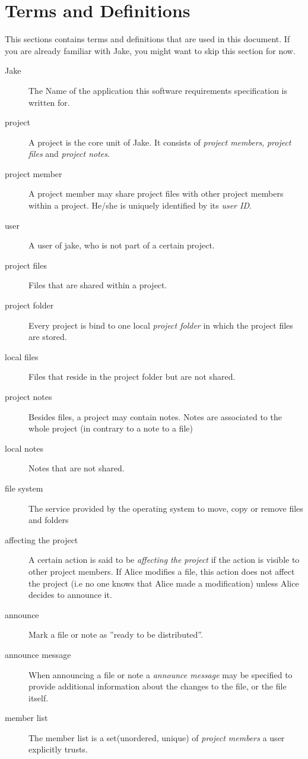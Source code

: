 \section{Terms and Definitions}
This sections contains terms and definitions that are used in this document. If you are already familiar with Jake, you might want to skip this section for now.
\begin{description}

\item[Jake] The Name of the application this software requirements specification is written for.
\item[project] A project is the core unit of Jake. It consists of \emph{project members}, \emph{project files} and \emph{project notes}.
\item[project member] A project member may share project files with other project members within a project. He/she is uniquely identified by its \emph{user ID}.
\item[user] A user of jake, who is not part of a certain project.
\item[project files] Files that are shared within a project.
\item[project folder] Every project is bind to one local \emph{project folder} in which the project files are stored.
\item[local files] Files that reside in the project folder but are not shared.
\item[project notes] Besides files, a project may contain notes. Notes  are associated to the whole project (in contrary to a note to a file)
\item[local notes] Notes that are not shared.
\item[file system] The service provided by the operating system to move, copy or remove files and folders
\item[affecting the project] A certain action is said to be \emph{affecting the project} if the action is visible to other project members. If Alice modifies a file, this action does not affect the project (i.e no one knows that Alice made a modification) unless Alice decides to announce it.
\item[announce] Mark a file or note as ''ready to be distributed''.
\item[announce message] When announcing a file or note a \emph{announce message} may be specified to provide additional information about the changes to the file, or the file itself.
\item[member list] The member list is a set(unordered, unique) of \emph{project members} a user explicitly trusts.

\end{description}
